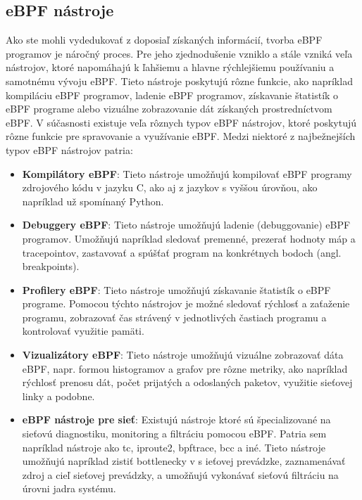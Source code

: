 \subsection{eBPF nástroje}
Ako ste mohli vydedukovať z doposiaľ získaných informácií, tvorba eBPF programov je náročný proces. Pre jeho zjednodušenie vzniklo a 
stále vzniká veľa nástrojov, ktoré napomáhajú k ľahšiemu a hlavne rýchlejšiemu používaniu a samotnému vývoju eBPF. 
Tieto nástroje poskytujú rôzne funkcie, ako napríklad kompiláciu eBPF programov, ladenie eBPF programov, získavanie štatistík o eBPF 
programe alebo vizuálne zobrazovanie dát získaných prostredníctvom  eBPF. V súčasnosti existuje veľa rôznych typov eBPF nástrojov, 
ktoré poskytujú rôzne funkcie pre spravovanie a využívanie eBPF. 
Medzi niektoré z najbežnejších typov eBPF nástrojov patria:
\begin{itemize}
    \item \textbf{Kompilátory eBPF}: Tieto nástroje umožňujú kompilovať eBPF programy zdrojového kódu v jazyku C, ako aj z jazykov s vyššou úrovňou, 
    ako napríklad už spomínaný  Python.
    \item \textbf{Debuggery eBPF}: Tieto nástroje umožňujú ladenie (debuggovanie) eBPF programov. Umožňujú napríklad sledovať premenné, 
    prezerať hodnoty máp a tracepointov, zastavovať a spúšťať program na konkrétnych bodoch (angl. breakpoints).
    \item \textbf{Profilery eBPF}: Tieto nástroje umožňujú získavanie štatistík o eBPF programe. Pomocou týchto nástrojov je možné sledovať rýchlosť a 
    zaťaženie programu, zobrazovať čas strávený v jednotlivých častiach programu a kontrolovať využitie pamäti.
    \item \textbf{Vizualizátory eBPF}: Tieto nástroje umožňujú vizuálne zobrazovať dáta eBPF, napr. formou histogramov a grafov pre rôzne metriky, 
    ako napríklad rýchlosť prenosu dát, počet prijatých a odoslaných paketov, využitie sieťovej linky a podobne.
    \item \textbf{eBPF nástroje pre sieť}: Existujú nástroje ktoré sú špecializované na sieťovú diagnostiku, monitoring a filtráciu pomocou eBPF. 
    Patria sem napríklad nástroje ako tc, iproute2, bpftrace, bcc a iné. Tieto nástroje umožňujú napríklad zistiť bottlenecky v s
    ieťovej prevádzke, zaznamenávať zdroj a cieľ sieťovej prevádzky, a umožňujú vykonávať sieťovú filtráciu na úrovni jadra systému.
\end{itemize}

